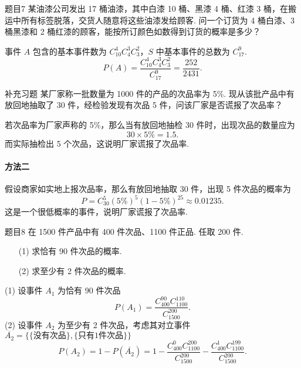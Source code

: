 \begin{question}{题目7}
    某油漆公司发出 17 桶油漆，其中白漆 10 桶、黑漆 4 桶、红漆 3 桶，在搬运中所有标签脱落，交货人随意将这些油漆发给顾客. 问一个订货为 4 桶白漆、3 桶黑漆和 2 桶红漆的顾客，能按所订颜色如数得到订货的概率是多少？
\end{question}
\begin{solution}
    事件 $A$ 包含的基本事件数为 $C_{10}^4 C_4^3 C_3^2$，$S$ 中基本事件的总数为 $C_{17}^9$.
    $$
        P(A) = \frac{C_{10}^4 C_4^3 C_3^2}{C_{17}^9} = \frac{252}{2431}.
    $$
\end{solution}

\begin{question}{补充习题}
    某厂家称一批数量为 1000 件的产品的次品率为 5\%. 现从该批产品中有放回地抽取了 30 件，经检验发现有次品 5 件，问该厂家是否谎报了次品率？
\end{question}
\begin{solution}
    若次品率为厂家声称的 5\%，那么当有放回地抽检 30 件时，出现次品的数量应为
    $$
        30 \times 5\%  = 1.5.
    $$
    而实际抽检出 5 个次品，这说明厂家谎报了次品率.
    \paragraph{方法二} 假设商家如实地上报次品率，那么有放回地抽取 30 件，出现 5 件次品的概率为
    $$
        P = C_{30}^{5}(5\%)^5(1-5\%)^{25} \approx 0.01235.
    $$
    这是一个很低概率的事件，说明厂家谎报了次品率.
\end{solution}

\begin{question}{题目8}
    在 1500 件产品中有 400 件次品、1100 件正品. 任取 200 件.
    \begin{itemize}
        \item [(1)] 求恰有 90 件次品的概率.
        \item [(2)] 求至少有 2 件次品的概率.
    \end{itemize}
\end{question}
\begin{solution}
    (1) 设事件 $A_1$ 为恰有 90 件次品
    $$
        P(A_1) = \frac{C_{400}^{90}C_{1100}^{110}}{C_{1500}^{200}}.
    $$
    (2) 设事件 $A_2$ 为至少有 2 件次品，考虑其对立事件 $\overline{A_2} = \{ \{\text{没有次品}\}, \{\text{只有1件次品}\} \}$
    $$
        P(A_2) = 1 - P(\overline{A_2})
        = 1 - \frac{C_{400}^{0}C_{1100}^{200}}{C_{1500}^{200}} - \frac{C_{400}^{1}C_{1100}^{199}}{C_{1500}^{200}}.
    $$
\end{solution}

